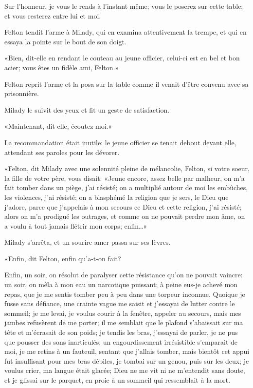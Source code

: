 \speak  Sur l'honneur, je vous le rends à l'instant même; vous le poserez sur cette table; et vous resterez entre lui et moi. 

Felton tendit l'arme à Milady, qui en examina attentivement la trempe, et qui en essaya la pointe sur le bout de son doigt. 

«Bien, dit-elle en rendant le couteau au jeune officier, celui-ci est en bel et bon acier; vous êtes un fidèle ami, Felton.» 

Felton reprit l'arme et la posa sur la table comme il venait d'être convenu avec sa prisonnière. 

Milady le suivit des yeux et fit un geste de satisfaction. 

«Maintenant, dit-elle, écoutez-moi.» 

La recommandation était inutile: le jeune officier se tenait debout devant elle, attendant ses paroles pour les dévorer. 

«Felton, dit Milady avec une solennité pleine de mélancolie, Felton, si votre soeur, la fille de votre père, vous disait: «Jeune encore, assez belle par malheur, on m'a fait tomber dans un piège, j'ai résisté; on a multiplié autour de moi les embûches, les violences, j'ai résisté; on a blasphémé la religion que je sers, le Dieu que j'adore, parce que j'appelais à mon secours ce Dieu et cette religion, j'ai résisté; alors on m'a prodigué les outrages, et comme on ne pouvait perdre mon âme, on a voulu à tout jamais flétrir mon corps; enfin\dots» 

Milady s'arrêta, et un sourire amer passa sur ses lèvres. 

«Enfin, dit Felton, enfin qu'a-t-on fait? 

\speak  Enfin, un soir, on résolut de paralyser cette résistance qu'on ne pouvait vaincre: un soir, on mêla à mon eau un narcotique puissant; à peine eus-je achevé mon repas, que je me sentis tomber peu à peu dans une torpeur inconnue. Quoique je fusse sans défiance, une crainte vague me saisit et j'essayai de lutter contre le sommeil; je me levai, je voulus courir à la fenêtre, appeler au secours, mais mes jambes refusèrent de me porter; il me semblait que le plafond s'abaissait sur ma tête et m'écrasait de son poids; je tendis les bras, j'essayai de parler, je ne pus que pousser des sons inarticulés; un engourdissement irrésistible s'emparait de moi, je me retins à un fauteuil, sentant que j'allais tomber, mais bientôt cet appui fut insuffisant pour mes bras débiles, je tombai sur un genou, puis sur les deux; je voulus crier, ma langue était glacée; Dieu ne me vit ni ne m'entendit sans doute, et je glissai sur le parquet, en proie à un sommeil qui ressemblait à la mort. 

